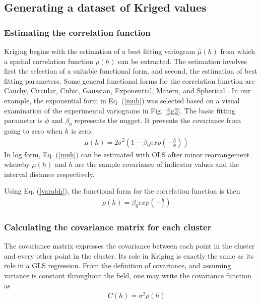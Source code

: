 \documentclass[Journal]{ascelike}
\begin{document}
\subsection{Generating a dataset of Kriged values} \label{casestudy3}
\subsubsection{Estimating the correlation function} \label{casestudy31}
Kriging begins with the estimation of a best fitting variogram $\hat \mu (h)$ from which a spatial
correlation function $\rho(h)$ can be extracted. The estimation involves first the selection of a
suitable functional form, and second, the estimation of best fitting parameters. Some general
functional forms for the correlation function are Cauchy, Circular, Cubic, Gaussian,
Exponential, Matern, and Spherical \cite{Wackernagel1998,Diggle2001}. In our
example, the exponential form in Eq. (\ref{muh}) was selected based on a visual examination of
the experimental variograms in Fig. \ref{fig2}. The basic fitting parameter is $\phi$ and $\beta_0$ represents the
nugget. It prevents the covariance from going to zero when $h$ is zero.
\begin{eqnarray}
&& \mu(h)=2\sigma^2\left(1-\beta_0 exp(-\frac{h}{\phi})\right)  \label{muh}
\end{eqnarray}
In log form, Eq. (\ref{muh}) can be estimated with OLS after minor rearrangement whereby $\mu(h)$ and $h$ are the sample 
covariance of indicator values and the interval distance respectively.

Using Eq. (\ref{varabh}), the functional form for the correlation function is then
\begin{eqnarray}
&& \rho(h)=\beta_0 exp(-\frac{h}{\phi})  \label{rhoh}
\end{eqnarray}
\subsubsection{Calculating the covariance matrix for each cluster} \label{casestudy32}
The covariance matrix expresses the covariance between each point in the cluster and every other point in the cluster. 
Its role in Kriging is exactly the same as its role in a GLS regression. From the definition of covariance, and assuming 
variance is constant throughout the field, one may write the covariance function as
\begin{eqnarray}
&& C(h)=\sigma^2 \rho(h)  \label{Ch}
\end{eqnarray}
\end{document}
